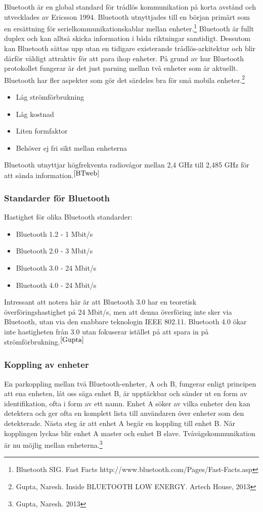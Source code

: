 \documentclass[a4paper,12pt,fleqn]{article}
\begin{document}
Bluetooth är en global standard för trådlös kommunikation på korta avstånd och utvecklades av Ericsson 1994. Bluetooth utnyttjades till en början primärt som en ersättning för serielkommunikationskablar mellan enheter.\footnote{\label{BTweb}Bluetooth SIG. Fast Facts http://www.bluetooth.com/Pages/Fast-Facts.asp}
Bluetooth är fullt duplex och kan alltså skicka information i båda riktningar samtidigt. Dessutom kan Bluetooth sättas upp utan en tidigare existerande trådlös-arkitektur och blir därför väldigt attraktiv för att para ihop enheter. På grund av hur Bluetooth protokollet fungerar är det just parning mellan två enheter som är aktuellt. Bluetooth har fler aspekter som gör det särdeles bra för små mobila enheter.\footnote{\label{Gupta}Gupta, Naresh. Inside BLUETOOTH LOW ENERGY. Artech House, 2013}
\begin{itemize}
\item Låg strömförbrukning 
\item Låg kostnad
\item Liten formfaktor
\item Behöver ej fri sikt mellan enheterna
\end{itemize}

Bluetooth utnyttjar högfrekventa radiovågor mellan 2,4 GHz till 2,485 GHz för att sända information.$^{\ref{BTweb}}$

\subsubsection{Standarder för Bluetooth}
Hastighet för olika Bluetooth standarder:
\begin{itemize}
\item Bluetooth 1.2 - 1 Mbit/s 
\item Bluetooth 2.0 - 3 Mbit/s
\item Bluetooth 3.0 - 24 Mbit/s
\item Bluetooth 4.0 - 24 Mbit/s
\end{itemize}

Intressant att notera här är att Bluetooth 3.0 har en teoretisk överföringshastighet på 24 Mbit/s, men att denna överföring inte sker via Bluetooth, utan via den snabbare teknologin IEEE 802.11. 
Bluetooth 4.0 ökar inte hastigheten från 3.0 utan fokuserar istället på att spara in på strömförbrukning.$^{\ref{Gupta}}$


\subsubsection{Koppling av enheter}
En parkoppling mellan två Bluetooth-enheter, A och B, fungerar enligt principen att ena enheten, låt oss säga enhet B, är upptäckbar och sänder ut en form av identifikation, ofta i form av ett namn. Enhet A söker av vilka enheter den kan detektera och ger ofta en komplett lista till användaren över enheter som den detekterade. Nästa steg är att enhet A begär en koppling till enhet B. När kopplingen lyckas blir enhet A master och enhet B slave. Tvåvägskommunikation är nu möjlig mellan enheterna.\footnote{\label{Gupta2}Gupta, Naresh. 2013}
\end{document}
